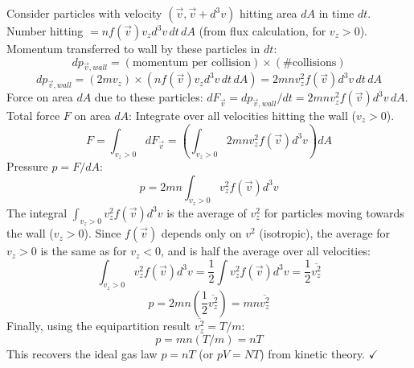 \documentclass[11pt]{article}
\newcommand{\avg}[1]{\overline{#1}}
\begin{document}
Consider particles with velocity $(\vec{v}, \vec{v}+d^3v)$ hitting area $dA$ in time $dt$.
Number hitting $= n f(\vec{v}) v_z d^3v \, dt \, dA$ (from flux calculation, for $v_z>0$).
Momentum transferred to wall by these particles in $dt$:
\[ dp_{\vec{v}, wall} = (\text{momentum per collision}) \times (\text{\# collisions}) \]
\[ dp_{\vec{v}, wall} = (2mv_z) \times (n f(\vec{v}) v_z d^3v \, dt \, dA) = 2mn v_z^2 f(\vec{v}) d^3v \, dt \, dA \]
Force on area $dA$ due to these particles: $dF_{\vec{v}} = dp_{\vec{v}, wall} / dt = 2mn v_z^2 f(\vec{v}) d^3v \, dA$.
Total force $F$ on area $dA$: Integrate over all velocities hitting the wall ($v_z>0$).
\[ F = \int_{v_z>0} dF_{\vec{v}} = \left( \int_{v_z>0} 2mn v_z^2 f(\vec{v}) d^3v \right) dA \]
Pressure $p = F/dA$:
\[ p = 2mn \int_{v_z>0} v_z^2 f(\vec{v}) d^3v \]
The integral $\int_{v_z>0} v_z^2 f(\vec{v}) d^3v$ is the average of $v_z^2$ for particles moving towards the wall ($v_z>0$). Since $f(\vec{v})$ depends only on $v^2$ (isotropic), the average for $v_z>0$ is the same as for $v_z<0$, and is half the average over all velocities:
\[ \int_{v_z>0} v_z^2 f(\vec{v}) d^3v = \frac{1}{2} \int v_z^2 f(\vec{v}) d^3v = \frac{1}{2} \avg{v_z^2} \]
\[ p = 2mn \left( \frac{1}{2} \avg{v_z^2} \right) = mn \avg{v_z^2} \]
Finally, using the equipartition result $\avg{v_z^2} = T/m$:
\[ p = mn (T/m) = nT \]
This recovers the ideal gas law $p=nT$ (or $pV=NT$) from kinetic theory. $\checkmark$
\end{document}
